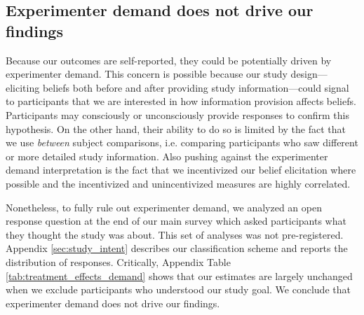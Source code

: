 \subsection{Experimenter demand does not drive our findings}

Because our outcomes are self-reported, they could be potentially driven by 
experimenter demand. This concern is possible because our study design---eliciting beliefs 
both before and after providing study information---could signal to participants that we are 
interested in how information provision affects beliefs.  Participants may consciously or unconsciously
provide responses to confirm this hypothesis. On the other hand, their ability to do so is limited
by the fact that we use {\em between} subject comparisons, i.e. comparing participants who saw 
different or more detailed study information. Also pushing against the experimenter demand interpretation 
is the fact that we incentivized our belief elicitation where possible and the incentivized and unincentivized
measures are highly correlated.

Nonetheless, to fully rule out experimenter demand, we analyzed an open response question at the end of our
main survey which asked participants what they thought the study was about. This set of analyses was not
pre-registered. Appendix \ref{sec:study_intent}  describes our classification scheme and reports the 
distribution of responses. Critically, Appendix Table \ref{tab:treatment_effects_demand} shows that 
our estimates are largely unchanged when we exclude participants who understood our study goal. We conclude
that experimenter demand does not drive our findings.